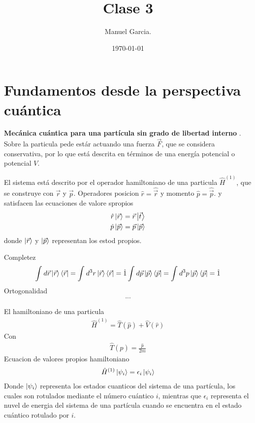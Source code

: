 \documentclass{article}
\title{Clase 3 }
\author{Manuel Garcia.}
\date{\today}
\begin{document}
\maketitle

\section{Fundamentos desde la perspectiva cuántica}
\textbf{Mecánica cuántica para una partícula sin grado de libertad interno }. Sobre la particula pede estár actuando una fuerza $ \vec F  $, que se considera conservativa, por lo que está descrita en términos de una energía potencial o potencial $ V  $. 


\hfill 

\hfill 

El sistema está descrito por el operador hamiltoniano de una particula $ \hat H ^ {(1) } $, que se construye con $ \vec r  $ y $ \vec p  $. Operadores posicion $ \hat r = \hat{\vec r } $ y momento $ \hat p = \hat{\vec p } $. y satisfacen las ecuaciones de valore spropios 
\begin{gather*}
  \hat r \ket{\vec r } = \vec r \ket{\vec t }\\
  \hat p \ket{\vec p } = \vec p \ket{\vec p }
\end{gather*}
donde $ \ket{\vec r }  $ y $ \ket{\vec p } $ representan los estod propios.

Completez 
\begin{gather*}
  \int_{}^{} d\vec r \ket{\vec r } \bra{\vec r } = \int_{}^{}d^3 r \ket{\vec r }\bra{\vec r } = \hat 1
  \int_{}^{} d\vec p \ket{\vec p } \bra{\vec p } = \int_{}^{}d^3 p \ket{\vec p }\bra{\vec p } = \hat 1  
\end{gather*}
Ortogonalidad
\begin{gather*}
  ... 
\end{gather*}


El hamiltoniano de una particula 
\begin{gather*}
  \hat H ^ {(1) } = \hat T (\hat p ) + \hat V (\hat r )
\end{gather*}
Con 
\begin{gather*}
  \hat T (\hat p ) = \frac{\hat p }{2m } 
\end{gather*}
Ecuacion de valores propios hamiltoniano 
\begin{gather*}
  \hat H ^ {(1) } \ket{\psi _i } = \epsilon_i \ket{\psi_i } 
\end{gather*}
Donde $ \ket{\psi_i } $ representa los estados cuanticos del sistema de una partícula, los cuales son rotulados mediante el número cuántico $ i  $, mientras que $ \epsilon_i  $ representa el nuvel de energia del sistema de una partícula cuando se encuentra en el estado cuántico rotulado por $ i  $.
\end{document}
